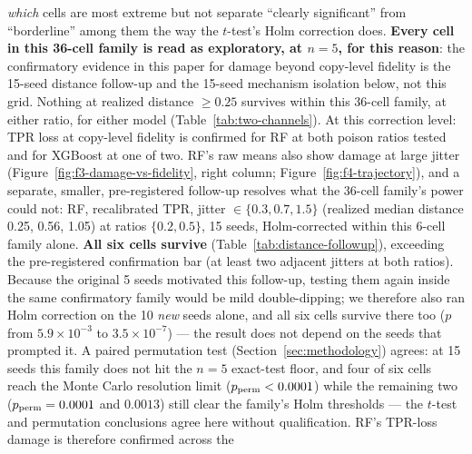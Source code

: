 \emph{which} cells are most extreme but not separate “clearly significant” from “borderline” among
them the way the $t$-test's Holm correction does. \textbf{Every cell in this 36-cell family is
read as exploratory, at $n=5$, for this reason}: the confirmatory evidence in this paper for
damage beyond copy-level fidelity is the 15-seed distance follow-up and the 15-seed mechanism
isolation below, not this grid. Nothing at realized distance $\ge0.25$ survives
within this 36-cell family, at either ratio, for either model (Table~\ref{tab:two-channels}).
At this correction level: TPR loss at copy-level fidelity is confirmed for RF at both poison
ratios tested and for XGBoost at one of two.
RF's raw means also show damage at large jitter (Figure~\ref{fig:f3-damage-vs-fidelity}, right
column; Figure~\ref{fig:f4-trajectory}), and a separate, smaller, pre-registered follow-up
resolves what the 36-cell family's power could not: RF, recalibrated TPR, jitter
$\in\{0.3,0.7,1.5\}$ (realized median distance 0.25, 0.56, 1.05) at ratios $\{0.2,0.5\}$, 15
seeds, Holm-corrected within this 6-cell family alone. \textbf{All six cells survive}
(Table~\ref{tab:distance-followup}), exceeding the pre-registered confirmation bar (at least two
adjacent jitters at both ratios). Because the original 5 seeds motivated this follow-up, testing
them again inside the same confirmatory family would be mild double-dipping; we therefore also
ran Holm correction on the 10 \emph{new} seeds alone, and all six cells survive there too ($p$
from $5.9\times10^{-3}$ to $3.5\times10^{-7}$) — the result does not depend on the seeds that
prompted it. A paired permutation test (Section~\ref{sec:methodology}) agrees: at 15 seeds this
family does not hit the $n=5$ exact-test floor, and four of six cells reach the Monte Carlo
resolution limit ($p_{\rm perm}<0.0001$) while the remaining two ($p_{\rm perm}=0.0001$ and
$0.0013$) still clear the family's Holm thresholds — the $t$-test and permutation conclusions
agree here without qualification. RF's TPR-loss damage is therefore confirmed across the
